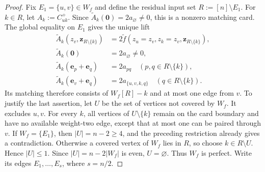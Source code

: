 \documentclass[11pt,letterpaper,onecolumn]{article}
\theoremstyle{plain}
\theoremstyle{definition}
\theoremstyle{remark}
\newcommand{\zero}{\mathbf 0}
\begin{document}
\begin{proof}
Fix \(E_1=\{u,v\}\in W_f\) and define the residual input set
\(R:=[n]\setminus E_1\).  For \(k\in R\), let
\(A_k:=C_{uk}^{+}\).  Since
\(\widetilde A_k(\zero)=2a_\varnothing\ne0\), this is a nonzero matching card.
The global equality on \(E_1\) gives the unique lift
\begin{align*}
  \widetilde A_k(z_v,{\mathbf z}_{R\setminus\{k\}})
  &=2\widetilde f(z_u=z_v,z_k=z_v,{\mathbf z}_{R\setminus\{k\}}),\\
  \widetilde A_k(\zero)&=2a_\varnothing\ne0,
  \\
  \widetilde A_k({\mathbf{e}}_p+{\mathbf{e}}_q)&=2a_{pq}
  \quad(p,q\in R\setminus\{k\}),\\
  \widetilde A_k({\mathbf{e}}_v+{\mathbf{e}}_q)&=2a_{\{u,v,k,q\}}
  \quad(q\in R\setminus\{k\}).
\end{align*}
Its matching therefore consists of \(W_f[R]-k\) and at most one edge from
\(v\).  To justify the last assertion, let \(U\) be the set of vertices not
covered by \(W_f\). It excludes \(u,v\).  For every \(k\), all vertices of
\(U\setminus\{k\}\) remain on the card boundary and have no available
weight-two edge, except that at most one can be paired through \(v\).
If \(W_f=\{E_1\}\), then \(|U|=n-2\ge4\), and the preceding restriction
already gives a contradiction.  Otherwise a covered vertex of \(W_f\) lies
in \(R\), so choose \(k\in R\setminus U\). Hence \(|U|\le1\).
Since \(|U|=n-2|W_f|\) is even, \(U=\varnothing\).  Thus \(W_f\) is
perfect. Write
its edges \(E_1,\ldots,E_s\), where \(s=n/2\).


\end{proof}
\end{document}

